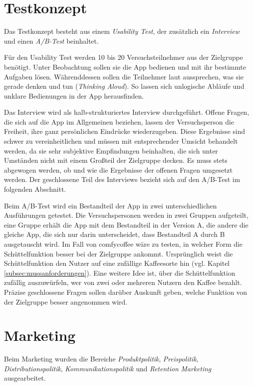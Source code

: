 \section{Testkonzept}
\label{sec:testkonzept}
Das Testkonzept besteht aus einem \emph{Usability Test}, der zusätzlich ein \emph{Interview} und einen \emph{A/B-Test} beinhaltet.

Für den Usability Test werden 10 bis 20  Versuchsteilnehmer aus der Zielgruppe benötigt. Unter Beobachtung sollen sie die App bedienen und mit ihr bestimmte Aufgaben lösen. Währenddessen sollen die Teilnehmer laut aussprechen, was sie gerade denken und tun (\emph{Thinking Aloud}). So lassen sich unlogische Abläufe und unklare Bedienungen in der App herausfinden.

Das Interview wird als halb-strukturiertes Interview durchgeführt. Offene Fragen, die sich auf die App im Allgemeinen beziehen, lassen der Versuchsperson die Freiheit, ihre ganz persönlichen Eindrücke wiederzugeben. Diese Ergebnisse sind schwer zu vereinheitlichen und müssen mit entsprechender Umsicht behandelt werden, da sie sehr subjektive Empfindungen beinhalten, die sich unter Umständen nicht mit einem Großteil der Zielgruppe decken. Es muss stets abgewogen werden, ob und wie die Ergebnisse der offenen Fragen umgesetzt werden. Der geschlossene Teil des Interviews bezieht sich auf den A/B-Test im folgenden Abschnitt.

Beim A/B-Test wird ein Bestandteil der App in zwei unterschiedlichen Ausführungen getestet. Die Versuchspersonen werden in zwei Gruppen aufgeteilt, eine Gruppe erhält die App mit dem Bestandteil in der Version A, die andere die gleiche App, die sich nur darin unterscheidet, dass Bestandteil A durch B ausgetauscht wird. Im Fall von comfycoffee wäre zu testen, in welcher Form die Schüttelfunktion besser bei der Zielgruppe ankommt. Ursprünglich weist die Schüttelfunktion den Nutzer auf eine zufällige Kaffeesorte hin (vgl. Kapitel \ref{subsec:mussanforderungen}). Eine weitere Idee ist, über die Schüttelfunktion zufällig auszuwürfeln, wer von zwei oder mehreren Nutzern den Kaffee bezahlt. Präzise geschlossene Fragen sollen darüber Auskunft geben, welche Funktion von der Zielgruppe besser angenommen wird.

\section{Marketing}
\label{sec:marketing}
Beim Marketing wurden die Bereiche \emph{Produktpolitik}, \emph{Preispolitik}, \emph{Distributionspolitik}, \emph{Kommunikationspolitik} und \emph{Retention Marketing} ausgearbeitet.

